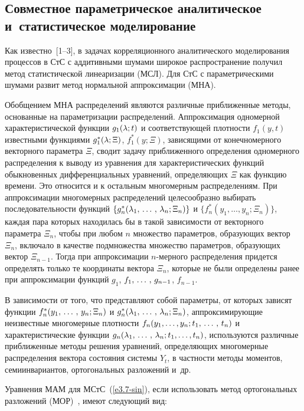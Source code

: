 \begin{multicols}{2}
\vspace*{-9pt}

\section{Совместное параметрическое аналитическое и~статистическое моделирование}

\vspace*{-2pt}

Как известно~[1--3], в задачах корреляционного аналитического моделирования процессов в СтС 
с аддитивными шумами широкое распространение получил метод статистической линеаризации (МСЛ). 
Для СтС с параметрическими шумами развит метод нормальной аппроксимации (МНА).

Обобщением МНА распределений являются различные
приближенные методы, основанные на параметризации распределений.
Аппроксимация одномерной характеристической функции $g_1 (\lambda;t)$
и соответствующей плотности $f_1 (y,t)$ известными функциями
$g_1^* (\lambda;\Xi)$, $f_1^* (y;\Xi)$, зависящими от
конечномерного векторного параметра $\Xi$,  сводит задачу
приближенного определения одномерного распределения к выводу из
уравнения для характеристических функций обыкновенных
дифференциальных уравнений, определяющих $\Xi$ как функцию
времени. Это относится и к остальным многомерным распределениям.
При аппроксимации многомерных распределений целесообразно выбирать
последовательности функций $\{g_n^* (\lambda_1,\,\ldots\,,\, \lambda_n;\Xi_n)\}$ и
 $\{ f_n^* (y_1,\ldots,y_n;\Xi_n)\}$, каждая пара
которых находилась бы в такой  за\-ви\-си\-мости от векторного параметра
$\Xi_n$, чтобы при любом $n$ множество параметров, образующих
вектор $\Xi_n$, включало в качестве подмножества множество
параметров, образующих вектор $\Xi_{n-1}$. Тогда при
аппроксимации $n$-мер\-но\-го распределения придется определять только
те координаты вектора $\Xi_n$, которые не были определены ранее
при аппроксимации функций $g_1$, $f_1,\,\ldots\,,\, g_{n-1}$, $f_{n-1}$.

В зависимости от того, что представляют собой параметры, от
которых зависят функции $f_n^* (y_1,\,\ldots\,,\, y_n;\Xi_n)$ и $g_n^*
(\lambda_1,\,\ldots\,,\, \lambda_n;\Xi_n)$, аппроксимирующие неизвестные
многомерные плотности $f_n (y_1,  \ldots,y_n; t_1 ,\,\ldots\,,\, t_n)$ и
характеристические функции $g_n (\lambda_1,\,\ldots\,,\, \lambda_n; t_1,\ldots,t_n)$,
используются различные приближенные методы решения
 уравнений, определяющих многомерные
распределения вектора состояния системы $Y_t$, в частности методы
моментов, семиинвариантов, ортогональных разложений и~др.

Уравнения МАМ для МСтС~(\ref{e3.7-sin}), если использовать метод 
ортогональных разложений (МОР)~\cite{2-sin, 3-sin}, имеют следующий вид:


\end{multicols}
